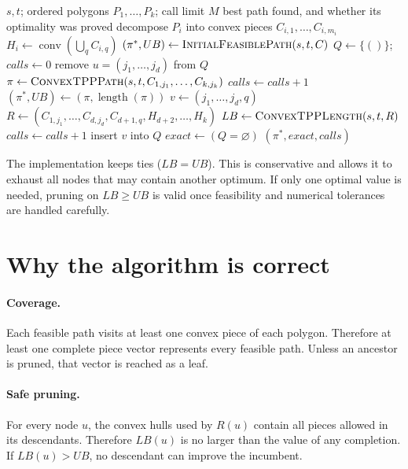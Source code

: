\documentclass[11pt]{article}
\newcommand{\conv}{\operatorname{conv}}
\begin{document}
\begin{algorithm}[H]
\caption{Branch and bound for fixed-order nonconvex TPP}
\label{alg:bnb}
\begin{algorithmic}[1]
\Require $s,t$; ordered polygons $P_1,\ldots,P_k$; call limit $M$
\Ensure best path found, and whether its optimality was proved
	\State decompose $P_i$ into convex pieces $C_{i,1},\ldots,C_{i,m_i}$
	\State $H_i\gets\conv(\bigcup_q C_{i,q})$
\EndFor
\State $(\pi^*,UB)\gets\Call{InitialFeasiblePath}{s,t,C}$
\State $Q\gets\{()\}$; $calls\gets0$
	\State remove $u=(j_1,\ldots,j_d)$ from $Q$
		\State $\pi\gets\Call{ConvexTPPPath}{s,t,C_{1,j_1},\ldots,C_{k,j_k}}$
		\State $calls\gets calls+1$
			\State $(\pi^*,UB)\gets(\pi,\operatorname{length}(\pi))$
		\EndIf
	\Else
			\State $v\gets(j_1,\ldots,j_d,q)$
			\State $R\gets(C_{1,j_1},\ldots,C_{d,j_d},C_{d+1,q},H_{d+2},\ldots,H_k)$
			\State $LB\gets\Call{ConvexTPPLength}{s,t,R}$
			\State $calls\gets calls+1$
				\State insert $v$ into $Q$
			\EndIf
		\EndFor
	\EndIf
\EndWhile
\State $exact\gets(Q=\varnothing)$
\State \Return $(\pi^*,exact,calls)$
\end{algorithmic}
\end{algorithm}

The implementation keeps ties ($LB=UB$). This is conservative and allows it
to exhaust all nodes that may contain another optimum. If only one optimal
value is needed, pruning on $LB\geq UB$ is valid once feasibility and numerical
tolerances are handled carefully.

\section{Why the algorithm is correct}

\paragraph{Coverage.}
Each feasible path visits at least one convex piece of each polygon. Therefore
at least one complete piece vector represents every feasible path. Unless an
ancestor is pruned, that vector is reached as a leaf.

\paragraph{Safe pruning.}
For every node $u$, the convex hulls used by $R(u)$ contain all pieces allowed
in its descendants. Therefore $LB(u)$ is no larger than the value of any
completion. If $LB(u)>UB$, no descendant can improve the incumbent.
\end{document}
